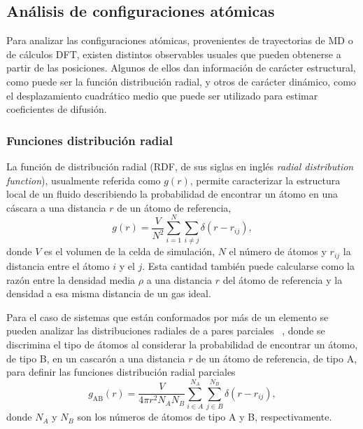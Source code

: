 \subsection{Análisis de configuraciones atómicas}\label{s:observables}

Para analizar las configuraciones atómicas, provenientes de trayectorias de MD
o de cálculos DFT, existen distintos observables usuales que pueden obtenerse
a partir de las posiciones. Algunos de ellos dan información de carácter 
estructural, como puede ser la función distribución radial, y otros de carácter 
dinámico, como el desplazamiento cuadrático medio que puede ser utilizado para 
estimar coeficientes de difusión.

\subsubsection{Funciones distribución radial}\label{ss:rdf}

La función de distribución radial (RDF, de sus siglas en inglés \textit{radial 
distribution function}), usualmente referida como $g(r)$, permite caracterizar la
estructura local de un fluido describiendo la probabilidad de encontrar un átomo
en una cáscara a una distancia $r$ de un átomo de referencia,
\begin{equation}\label{eq:rdf}
    g(r) = \frac{V}{N^2} \sum_{i=1}^N \sum_{i \neq j} \delta(r - r_{ij}),
\end{equation}
donde $V$ es el volumen de la celda de simulación, $N$ el número de átomos y 
$r_{ij}$ la distancia entre el átomo $i$ y el $j$. Esta cantidad también puede 
calcularse como la razón entre la densidad media $\rho$ a una distancia $r$ del 
átomo de referencia y la densidad a esa misma distancia de un gas ideal.

Para el caso de sistemas que están conformados por más de un elemento se pueden 
analizar las distribuciones radiales de a pares parciales ~\cite{lamparter1995}, 
donde se discrimina el tipo de átomos al considerar la probabilidad de encontrar 
un átomo, de tipo B, en un cascarón a una distancia $r$ de un átomo de referencia, 
de tipo A, para definir las funciones distribución radial parciales
\begin{equation}\label{eq:prdf}
    g_{\text{AB}}(r) = \frac{V}{4 \pi r^2 N_A N_B} \sum_{i \in A}^{N_A} \sum_{j \in B}^{N_B} \delta(r - r_{ij}),
\end{equation}
donde $N_A$ y $N_B$ son los números de átomos de tipo A y B, respectivamente. 

